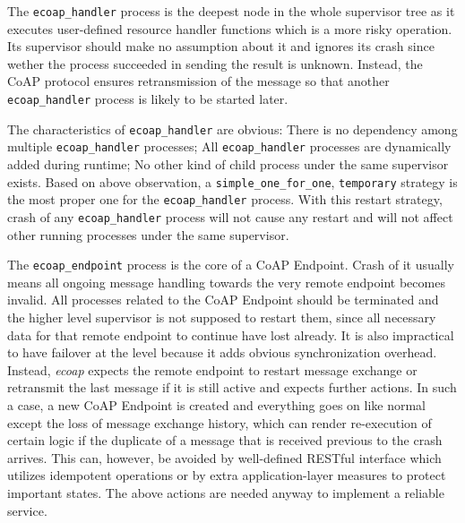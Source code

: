 The \verb|ecoap_handler| process is the deepest node in the whole supervisor tree as it executes user-defined resource handler functions which is a more risky operation. Its supervisor should make no assumption about it and ignores its crash since wether the process succeeded in sending the result is unknown. Instead, the CoAP protocol ensures retransmission of the message so that another \verb|ecoap_handler| process is likely to be started later. 

The characteristics of \verb|ecoap_handler| are obvious: There is no dependency among multiple \verb|ecoap_handler| processes; All \verb|ecoap_handler| processes are dynamically added during runtime; No other kind of child process under the same supervisor exists. Based on above observation, a  \verb|simple_one_for_one|, \verb|temporary| strategy is the most proper one for the \verb|ecoap_handler| process. With this restart strategy, crash of any \verb|ecoap_handler| process will not cause any restart and will not affect other running processes under the same supervisor.

The \verb|ecoap_endpoint| process is the core of a CoAP Endpoint. Crash of it usually means all ongoing message handling towards the very remote endpoint becomes invalid. All processes related to the CoAP Endpoint should be terminated and the higher level supervisor is not supposed to restart them, since all necessary data for that remote endpoint to continue have lost already. It is also impractical to have failover at the level because it adds obvious synchronization overhead. Instead, \textit{ecoap} expects the remote endpoint to restart message exchange or retransmit the last message if it is still active and expects further actions. In such a case, a new CoAP Endpoint is created and everything goes on like normal except the loss of message exchange history, which can render re-execution of certain logic if the duplicate of a message that is received previous to the crash arrives. This can, however, be avoided by well-defined RESTful interface which utilizes idempotent operations or by extra application-layer measures to protect important states. The above actions are needed anyway to implement a reliable service.

